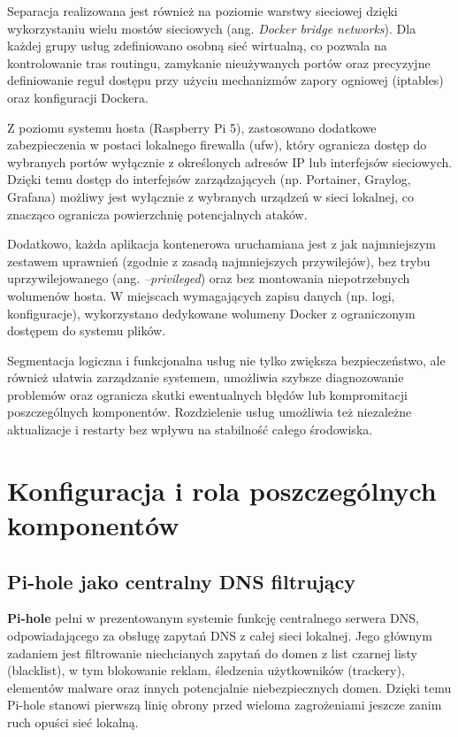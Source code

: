 \documentclass[
    left=2.5cm,         %
    right=2.5cm,        %
    top=2.5cm,          %
    bottom=3cm,         %
    bindingoffset=6mm,  %
    nohyphenation=true %
]{eiti/eiti-thesis} %
\begin{document}
Separacja realizowana jest również na poziomie warstwy sieciowej dzięki wykorzystaniu wielu mostów sieciowych (ang. \textit{Docker bridge networks}). Dla każdej grupy usług zdefiniowano osobną sieć wirtualną, co pozwala na kontrolowanie tras routingu, zamykanie nieużywanych portów oraz precyzyjne definiowanie reguł dostępu przy użyciu mechanizmów zapory ogniowej (iptables) oraz konfiguracji Dockera.

Z poziomu systemu hosta (Raspberry Pi 5), zastosowano dodatkowe zabezpieczenia w postaci lokalnego firewalla (ufw), który ogranicza dostęp do wybranych portów wyłącznie z określonych adresów IP lub interfejsów sieciowych. Dzięki temu dostęp do interfejsów zarządzających (np. Portainer, Graylog, Grafana) możliwy jest wyłącznie z wybranych urządzeń w sieci lokalnej, co znacząco ogranicza powierzchnię potencjalnych ataków.

Dodatkowo, każda aplikacja kontenerowa uruchamiana jest z jak najmniejszym zestawem uprawnień (zgodnie z zasadą najmniejszych przywilejów), bez trybu uprzywilejowanego (ang. \textit{--privileged}) oraz bez montowania niepotrzebnych wolumenów hosta. W miejscach wymagających zapisu danych (np. logi, konfiguracje), wykorzystano dedykowane wolumeny Docker z ograniczonym dostępem do systemu plików.

Segmentacja logiczna i funkcjonalna usług nie tylko zwiększa bezpieczeństwo, ale również ułatwia zarządzanie systemem, umożliwia szybsze diagnozowanie problemów oraz ogranicza skutki ewentualnych błędów lub kompromitacji poszczególnych komponentów. Rozdzielenie usług umożliwia też niezależne aktualizacje i restarty bez wpływu na stabilność całego środowiska.

\newpage 
\section{Konfiguracja i rola poszczególnych komponentów}
\subsection{Pi-hole jako centralny DNS filtrujący}

\textbf{Pi-hole} pełni w prezentowanym systemie funkcję centralnego serwera DNS, odpowiadającego za obsługę zapytań DNS z całej sieci lokalnej. Jego głównym zadaniem jest filtrowanie niechcianych zapytań do domen z list czarnej listy (blacklist), w tym blokowanie reklam, śledzenia użytkowników (trackery), elementów malware oraz innych potencjalnie niebezpiecznych domen. Dzięki temu Pi-hole stanowi pierwszą linię obrony przed wieloma zagrożeniami jeszcze zanim ruch opuści sieć lokalną.
\end{document}
